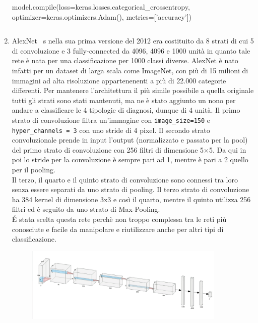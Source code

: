 \begin{enumerate}
\begin{python}
model.compile(loss=keras.losses.categorical_crossentropy,
              optimizer=keras.optimizers.Adam(),
              metrics=['accuracy'])
    \end{python}
    \begin{lstlisting}[caption= {Codice Python del primo modello utilizzato.} ]
    \end{lstlisting}
    \item AlexNet ~\cite{alexnet}s nella sua prima versione del 2012 era costituito da 8 strati di cui 5 di convoluzione e 3 fully-connected da 4096,
     4096 e 1000 unità in quanto tale rete è nata per una classificazione per 1000 classi diverse. AlexNet è nato infatti per un dataset di larga scala come ImageNet, 
     con più di 15 milioni di immagini ad alta risoluzione appartenenenti a più di 22.000 categorie differenti. Per mantenere l'architettura il più simile possibile 
     a quella originale tutti gli strati sono stati mantenuti, ma ne è stato aggiunto un nono per andare a classificare le 4 tipologie di diagnosi, dunque di 4 unità.
     Il primo strato di convoluzione filtra un'immagine con \lstinline{image_size=150} e \lstinline{hyper_channels = 3} con uno stride di 4 pixel. 
     Il secondo strato convoluzionale prende in input l'output (normalizzato e passato per la pool) del primo strato di convoluzione con 256 filtri di dimensione 5×5.
      Da qui in poi lo stride per la convoluzione è sempre pari ad 1, mentre è pari a 2 quello per il pooling. \\
     Il terzo, il quarto e il quinto strato di convoluzione sono connessi tra loro  senza essere separati da uno strato di pooling. 
     Il terzo strato di convoluzione ha 384 kernel di dimensione 3x3 e così il quarto, mentre il 
     quinto utilizza 256 filtri ed è seguito da uno strato di Max-Pooling.\\
     É stata scelta questa rete perchè non troppo complessa tra le reti più conosciute e facile da manipolare e riutilizzare
      anche per altri tipi di classificazione.
      \begin{figure}[hb!]
        \centering
        \includegraphics[width=0.9\textwidth]{Figures/alexnet.png}

\end{figure}
\end{enumerate}
